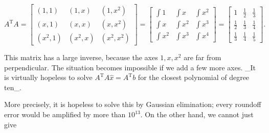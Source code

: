 \[A^{\mathrm{T}}A=\begin{bmatrix}(1,1)&(1,x)&(1,x^{2})\\ (x,1)&(x,x)&(x,x^{2})\\ (x^{2},1)&(x^{2},x)&(x^{2},x^{2})\end{bmatrix}=\begin{bmatrix}\int 1&\int x& \int x^{2}\\ \int x&\int x^{2}&\int x^{3}\\ \int x^{2}&\int x^{3}&\int x^{4}\end{bmatrix}=\begin{bmatrix}1&\frac{1}{2}& \frac{1}{3}\\ \frac{1}{2}&\frac{1}{3}&\frac{1}{4}\\ \frac{1}{3}&\frac{1}{4}&\frac{1}{5}\end{bmatrix}.\]

This matrix has a large inverse, because the axes \(1,x,x^{2}\) are far from perpendicular. The situation becomes impossible if we add a few more axes. _It is virtually hopeless to solve \(A^{\mathrm{T}}A\widehat{x}=A^{\mathrm{T}}b\) for the closest polynomial of degree ten_.

More precisely, it is hopeless to solve this by Gaussian elimination; every roundoff error would be amplified by more than \(10^{13}\). On the other hand, we cannot just give